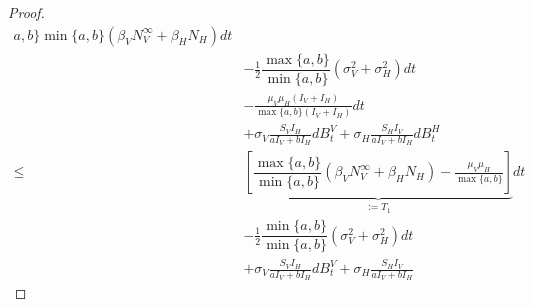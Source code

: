 \begin{proof}
\begin{equation}
\begin{aligned}
{                    a, b
                \}
            }{
                \min\{
                    a, b
                \}
            }
            \left (
                 \beta_{V} N_V ^ \infty
                +
                \beta_H N_H
            \right ) dt
            \\
            & 
            -
            \frac{1}{2}
            \dfrac{
                \max\{
                    a, b
                \}
            }{
                \min\{
                    a, b
                \}
            }
            \left(
                \sigma_V ^ 2
                +
                \sigma_H ^ 2
            \right) dt
            \\
            &
            -
            \frac{
                \mu_V \mu_H (I_V + I_H)
            }{\max \{a, b\} (I_V + I_H)}
            dt
            \\
            & +
            \sigma_V 
            \frac{S_V I_H}{a I_V + b I_H}
            d B_t ^ V
            +
            \sigma_H
            \frac{S_H I_V}{a I_V + b I_H}
            d B_t ^ H
            \\
            \leq &
                \underbrace{
                    \left[
                        \dfrac{
                            \max\{a, b\}
                        }{
                            \min\{a, b\}
                        }
                        \left (
                             \beta_V N_V ^ \infty
                            +
                            \beta_H N_H
                        \right )
                        -
                        \frac{
                            \mu_V \mu_H 
                        }{
                            \max \{a, b\} 
                        }
                     \right]
                }_{:= T_1}
                 dt
            \\
            &
            -
            \frac{1}{2}
                \dfrac{
                    \min\{
                        a, b
                    \}
                }{
                    \min\{
                        a, b
                    \}
                }
            \left (
                \sigma_V ^ 2
                +
                \sigma_H ^ 2
            \right ) dt
            \\
            & +
            \sigma_V 
            \frac{S_V I_H}{a I_V + b I_H}
            d B_t ^ V
            +
            \sigma_H
            \frac{S_H I_V}{a I_V + b I_H}

\end{aligned}
\end{equation}
\end{proof}
